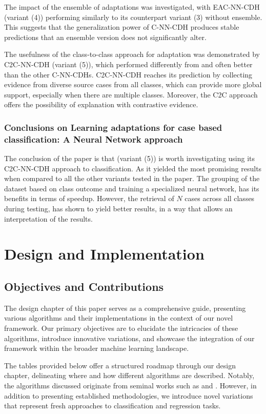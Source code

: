 \documentclass[a4paper, 12pt]{report}
\begin{document}
The impact of the ensemble of adaptations was investigated, with EAC-NN-CDH (variant (4)) performing similarly to its counterpart variant (3) without ensemble.
This suggests that the generalization power of C-NN-CDH produces stable predictions that an ensemble version does not significantly alter.

The usefulness of the class-to-class approach for adaptation was demonstrated by C2C-NN-CDH (variant (5)), which performed differently from and often better than the other C-NN-CDHs.
C2C-NN-CDH reaches its prediction by collecting evidence from diverse source cases from all classes,
which can provide more global support, especially when there are multiple classes. Moreover,
the C2C approach offers the possibility of explanation with contrastive evidence.

\subsection{Conclusions on Learning adaptations for case based classification: A Neural Network approach}
The conclusion of the paper \cite{ye2021learning} is that (variant (5)) is worth investigating using its C2C-NN-CDH approach to classification.
As it yielded the most promising results when compared to all the other variants tested in the paper. The grouping of the dataset based on class outcome and training a specialized neural network,
has its benefits in terms of speedup. However, the retrieval of $N$ cases across all classes during testing, has shown to yield better results, in a way that allows an interpretation of the results.

\chapter{Design and Implementation}
\label{ch:Design}

\section*{Objectives and Contributions}

The design chapter of this paper serves as a comprehensive guide, presenting various algorithms and their implementations in the context of our novel framework. 
Our primary objectives are to elucidate the intricacies of these algorithms, introduce innovative variations, and 
showcase the integration of our framework within the broader machine learning landscape.

The tables provided below offer a structured roadmap through our design chapter, delineating where and how different algorithms are described. 
Notably, the algorithms discussed originate from seminal works such as \cite{learningFromDifferences2022} and \cite{ye2021learning}. 
However, in addition to presenting established methodologies, we introduce novel variations that represent fresh approaches to classification and regression tasks.
\end{document}
